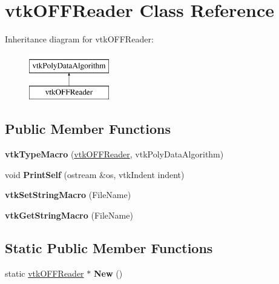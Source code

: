 \hypertarget{classvtk_o_f_f_reader}{}\section{vtk\+O\+F\+F\+Reader Class Reference}
\label{classvtk_o_f_f_reader}
Inheritance diagram for vtk\+O\+F\+F\+Reader\+:\begin{figure}[H]
\begin{center}
\leavevmode
\includegraphics[height=2.000000cm]{classvtk_o_f_f_reader}
\end{center}
\end{figure}
\subsection*{Public Member Functions}
\begin{DoxyCompactItemize}
\item 
\hypertarget{classvtk_o_f_f_reader_a47e5808daffc60ed3d6057a19b7d5212}{}{\bfseries vtk\+Type\+Macro} (\hyperlink{classvtk_o_f_f_reader}{vtk\+O\+F\+F\+Reader}, vtk\+Poly\+Data\+Algorithm)\label{classvtk_o_f_f_reader_a47e5808daffc60ed3d6057a19b7d5212}

\item 
\hypertarget{classvtk_o_f_f_reader_a0e196c48da12b30af77f0a32fc7626d3}{}void {\bfseries Print\+Self} (ostream \&os, vtk\+Indent indent)\label{classvtk_o_f_f_reader_a0e196c48da12b30af77f0a32fc7626d3}

\item 
\hypertarget{classvtk_o_f_f_reader_a6172b4e9d5b178133c7232f1c72b1278}{}{\bfseries vtk\+Set\+String\+Macro} (File\+Name)\label{classvtk_o_f_f_reader_a6172b4e9d5b178133c7232f1c72b1278}

\item 
\hypertarget{classvtk_o_f_f_reader_a629e23ab89107fe49e27e080e5e16399}{}{\bfseries vtk\+Get\+String\+Macro} (File\+Name)\label{classvtk_o_f_f_reader_a629e23ab89107fe49e27e080e5e16399}

\end{DoxyCompactItemize}
\subsection*{Static Public Member Functions}
\begin{DoxyCompactItemize}
\item 
\hypertarget{classvtk_o_f_f_reader_ab8f333591909941490135c423d5ad5aa}{}static \hyperlink{classvtk_o_f_f_reader}{vtk\+O\+F\+F\+Reader} $\ast$ {\bfseries New} ()\label{classvtk_o_f_f_reader_ab8f333591909941490135c423d5ad5aa}

\end{DoxyCompactItemize}
